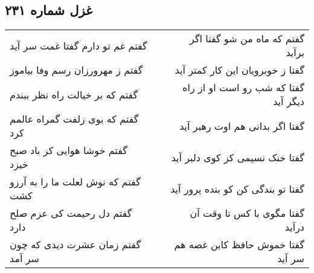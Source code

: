 \begin{center}
\section*{غزل شماره ۲۳۱}
\label{sec:sh231}
\begin{longtable}{l p{0.5cm} r}
گفتم غم تو دارم گفتا غمت سر آید
&&
گفتم که ماه من شو گفتا اگر برآید
\\
گفتم ز مهرورزان رسم وفا بیاموز
&&
گفتا ز خوبرویان این کار کمتر آید
\\
گفتم که بر خیالت راه نظر ببندم
&&
گفتا که شب رو است او از راه دیگر آید
\\
گفتم که بوی زلفت گمراه عالمم کرد
&&
گفتا اگر بدانی هم اوت رهبر آید
\\
گفتم خوشا هوایی کز باد صبح خیزد
&&
گفتا خنک نسیمی کز کوی دلبر آید
\\
گفتم که نوش لعلت ما را به آرزو کشت
&&
گفتا تو بندگی کن کو بنده پرور آید
\\
گفتم دل رحیمت کی عزم صلح دارد
&&
گفتا مگوی با کس تا وقت آن درآید
\\
گفتم زمان عشرت دیدی که چون سر آمد
&&
گفتا خموش حافظ کاین غصه هم سر آید
\\
\end{longtable}
\end{center}
